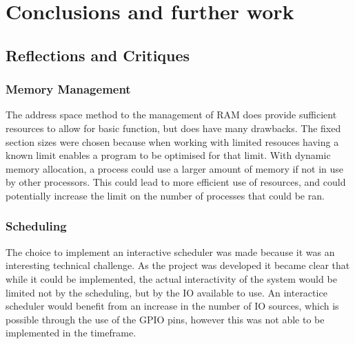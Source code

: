 \chapter[Conclusions and further work]{Conclusions and further work}
\label{cha:conc}
\section{Reflections and Critiques}
\subsection{Memory Management}
The address space method to the management of RAM does provide sufficient resources to allow for basic function, but does have many drawbacks. The fixed section sizes were chosen because when working with limited resouces having a known limit enables a program to be optimised for that limit. With dynamic memory allocation, a process could use a larger amount of memory if not in use by other processors. This could lead to more efficient use of resources, and could potentially increase the limit on the number of processes that could be ran.
\subsection{Scheduling}
The choice to implement an interactive scheduler was made because it was an interesting technical challenge. As the project was developed it became clear that while it could be implemented, the actual interactivity of the system would be limited not by the scheduling, but by the IO available to use. An interactice scheduler would benefit from an increase in the number of IO sources, which is possible through the use of the GPIO pins, however this was not able to be implemented in the timeframe.